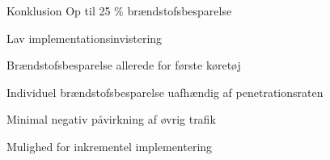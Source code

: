 \begin{frame}{Konklusion}
Op til 25 \% brændstofsbesparelse
\vspace{4mm}

Lav implementationsinvistering
\vspace{4mm}

Brændstofsbesparelse allerede for første køretøj
\vspace{4mm}

Individuel brændstofsbesparelse uafhændig af penetrationsraten
\vspace{4mm}

Minimal negativ påvirkning af øvrig trafik
\vspace{4mm}


Mulighed for inkrementel implementering
\end{frame}

